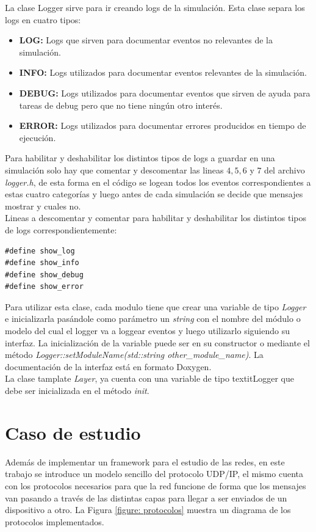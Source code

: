 \documentclass[10pt,a4paper]{article}
\begin{document}
La clase Logger sirve para ir creando logs de la simulación. Esta clase separa los logs en cuatro tipos:

\begin{itemize}
\item \textbf{LOG:} Logs que sirven para documentar eventos no relevantes de la simulación.
\item \textbf{INFO:} Logs utilizados para documentar eventos relevantes de la simulación.
\item \textbf{DEBUG:} Logs utilizados para documentar eventos que sirven de ayuda para tareas de debug pero que no tiene ningún otro interés.
\item \textbf{ERROR:} Logs utilizados para documentar errores producidos en tiempo de ejecución.
\end{itemize}

Para habilitar y deshabilitar los distintos tipos de logs a guardar en una simulación solo hay que comentar y descomentar las lineas $4,5,6$ y $7$ del archivo \textit{logger.h}, de esta forma en el código se logean todos los eventos correspondientes a estas cuatro categorías y luego antes de cada simulación se decide que mensajes mostrar y cuales no. \\

Lineas a descomentar y comentar para habilitar y deshabilitar los distintos tipos de logs correspondientemente:
\begin{lstlisting}
#define show_log
#define show_info
#define show_debug
#define show_error
\end{lstlisting}

Para utilizar esta clase, cada modulo tiene que crear una variable de tipo \textit{Logger} e inicializarla pasándole como parámetro un \textit{string} con el nombre del módulo o modelo del cual el logger va a loggear eventos y luego utilizarlo siguiendo su interfaz. La inicialización de la variable puede ser en su constructor o mediante el método \textit{Logger::setModuleName(std::string other\_module\_name)}. La documentación de la interfaz está en formato Doxygen. \\

La clase tamplate \textit{Layer}, ya cuenta con una variable de tipo textit{Logger} que debe ser inicializada en el método \textit{init}.

\newpage

\section{Caso de estudio}
	Además de implementar un framework para el estudio de las redes, en este trabajo se introduce un modelo sencillo del protocolo UDP/IP, el mismo cuenta con los protocolos necesarios para que la red funcione de forma que los mensajes van pasando a través de las distintas capas para llegar a ser enviados de un dispositivo a otro. La Figura \ref{figure: protocolos} muestra un diagrama de los protocolos implementados. \\
\end{document}
